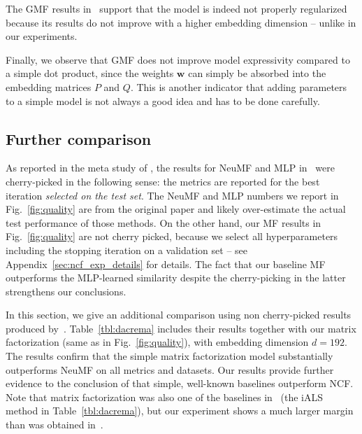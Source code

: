 \documentclass{article}
\newcommand{\bw}{\mathbf{w}}
\begin{document}
The GMF results in~\cite{he:www17} support that the model is indeed not properly regularized because its results do not improve with a higher embedding dimension -- unlike in our experiments.

Finally, we observe that GMF does not improve model expressivity compared to a simple dot product, since the weights $\bw$ can simply be absorbed into the embedding matrices $P$ and $Q$.
This is another indicator that adding parameters to a simple model is not always a good idea and has to be done carefully.

\subsection{Further comparison}
\label{sec:non_cherry_picked}

As reported in the meta study of \cite{dacrema:arxiv2019}, the results for NeuMF and MLP in~\cite{he:www17} were cherry-picked in the following sense: the metrics are reported for the best iteration \emph{selected on the test set}.
The NeuMF and MLP numbers we report in Fig.~\ref{fig:quality} are from the original paper and likely over-estimate the actual test performance of those methods.
On the other hand, our MF results in Fig.~\ref{fig:quality} are not cherry picked, because we select all hyperparameters including the stopping iteration on a validation set -- see Appendix~\ref{sec:ncf_exp_details} for details.
The fact that our baseline MF outperforms the MLP-learned similarity despite the cherry-picking in the latter strengthens our conclusions.

In this section, we give an additional comparison using non cherry-picked results produced by~\cite{dacrema:arxiv2019}.
Table~\ref{tbl:dacrema} includes their results together with our matrix factorization (same as in Fig.~\ref{fig:quality}), with embedding dimension $d=192$.
The results confirm that the simple matrix factorization model substantially outperforms NeuMF on all metrics and datasets.
Our results provide further evidence to the conclusion of \cite{dacrema:arxiv2019} that simple, well-known baselines outperform NCF.
Note that matrix factorization was also one of the baselines in~\cite{dacrema:arxiv2019}  (the iALS method in Table~\ref{tbl:dacrema}), but our experiment shows a much larger margin than was obtained in~\cite{dacrema:arxiv2019}.
\end{document}

